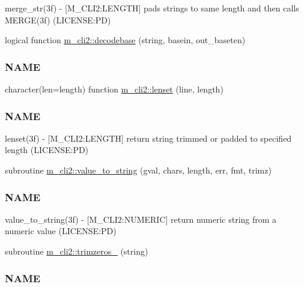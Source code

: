 \begin{DoxyCompactItemize}
\begin{DoxyCompactList}
merge\+\_\+str(3f) -\/ \mbox{[}M\+\_\+\+C\+L\+I2\+:L\+E\+N\+G\+TH\mbox{]} pads strings to same length and then calls M\+E\+R\+G\+E(3f) (L\+I\+C\+E\+N\+SE\+:PD) \end{DoxyCompactList}\item 
logical function \mbox{\hyperlink{namespacem__cli2_a1029304d495b2bf791e03cfab5983bbb}{m\+\_\+cli2\+::decodebase}} (string, basein, out\+\_\+baseten)
\begin{DoxyCompactList}\small\item\em \subsubsection*{N\+A\+ME}\end{DoxyCompactList}\item 
character(len=length) function \mbox{\hyperlink{namespacem__cli2_ad13853611abfee00d40ffa020662ec8a}{m\+\_\+cli2\+::lenset}} (line, length)
\begin{DoxyCompactList}\small\item\em \subsubsection*{N\+A\+ME}

lenset(3f) -\/ \mbox{[}M\+\_\+\+C\+L\+I2\+:L\+E\+N\+G\+TH\mbox{]} return string trimmed or padded to specified length (L\+I\+C\+E\+N\+SE\+:PD) \end{DoxyCompactList}\item 
subroutine \mbox{\hyperlink{namespacem__cli2_a1bbcefd886dabb0286e2cb14ab54034f}{m\+\_\+cli2\+::value\+\_\+to\+\_\+string}} (gval, chars, length, err, fmt, trimz)
\begin{DoxyCompactList}\small\item\em \subsubsection*{N\+A\+ME}

value\+\_\+to\+\_\+string(3f) -\/ \mbox{[}M\+\_\+\+C\+L\+I2\+:N\+U\+M\+E\+R\+IC\mbox{]} return numeric string from a numeric value (L\+I\+C\+E\+N\+SE\+:PD) \end{DoxyCompactList}\item 
subroutine \mbox{\hyperlink{namespacem__cli2_a770a66475094fd80493d46498de1ebf7}{m\+\_\+cli2\+::trimzeros\+\_\+}} (string)
\begin{DoxyCompactList}\small\item\em \subsubsection*{N\+A\+ME}


\end{DoxyCompactList}
\end{DoxyCompactItemize}
